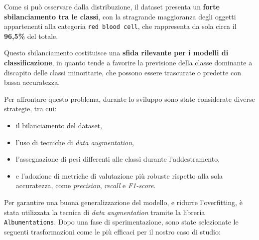 \documentclass[minted, draw]{../tex/hebdomon}
\begin{document}
Come si può osservare dalla distribuzione, il dataset presenta un \textbf{forte sbilanciamento tra le classi}, con la stragrande maggioranza degli oggetti appartenenti alla categoria \texttt{red blood cell}, che rappresenta da sola circa il \textbf{96{,}5\%} del totale.

Questo sbilanciamento costituisce una \textbf{sfida rilevante per i modelli di classificazione}, in quanto tende a favorire la previsione della classe dominante a discapito delle classi minoritarie, che possono essere trascurate o predette con bassa accuratezza.

Per affrontare questo problema, durante lo sviluppo sono state considerate diverse strategie, tra cui:
\begin{itemize}
   \item il bilanciamento del dataset,
   \item l’uso di tecniche di \textit{data augmentation},
   \item l’assegnazione di pesi differenti alle classi durante l’addestramento,
   \item e l’adozione di metriche di valutazione più robuste rispetto alla sola accuratezza, come \textit{precision}, \textit{recall} e \textit{F1-score}.
\end{itemize}



Per garantire una buona generalizzazione del modello, e ridurre l'overfitting, è stata utilizzata la tecnica di \textit{data augmentation} tramite la libreria \texttt{Albumentations}. Dopo una fase di sperimentazione, sono state selezionate le seguenti trasformazioni come le più efficaci per il nostro caso di studio:
\end{document}
